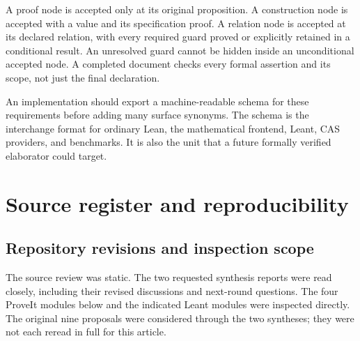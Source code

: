 \documentclass[11pt,a4paper]{article}
\theoremstyle{remark}\newtheorem{example}[proposition]{Example}
\begin{document}
A proof node is accepted only at its original proposition. A construction node is accepted with a value and its specification proof. A relation node is accepted at its declared relation, with every required guard proved or explicitly retained in a conditional result. An unresolved guard cannot be hidden inside an unconditional accepted node. A completed document checks every formal assertion and its scope, not just the final declaration.

An implementation should export a machine-readable schema for these requirements before adding many surface synonyms. The schema is the interchange format for ordinary Lean, the mathematical frontend, Leant, CAS providers, and benchmarks. It is also the unit that a future formally verified elaborator could target.

\section{Source register and reproducibility}\label{app:sources}
\subsection{Repository revisions and inspection scope}
The source review was static. The two requested synthesis reports were read closely, including their revised discussions and next-round questions. The four ProveIt modules below and the indicated Leant modules were inspected directly. The original nine proposals were considered through the two syntheses; they were not each reread in full for this article.
\end{document}
